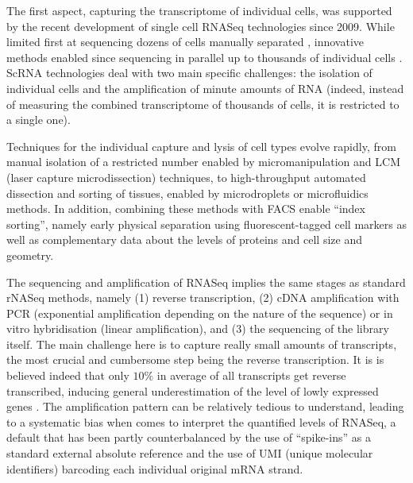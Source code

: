 The first aspect, capturing the transcriptome of individual cells, was supported by the recent development of single cell RNASeq technologies since 2009. While limited first at sequencing dozens of cells manually separated \autocite{tang_etal09}, innovative methods enabled since sequencing in parallel up to thousands of individual cells \autocite{fan_etal15}. ScRNA technologies deal with two main specific challenges: the isolation of individual cells and the amplification of minute amounts of RNA (indeed, instead of measuring the combined transcriptome of thousands of cells, it is restricted to a single one). 

Techniques for the individual capture and lysis of cell types evolve rapidly, from manual isolation of a restricted number enabled by micromanipulation and LCM (laser capture microdissection) techniques, to high-throughput automated dissection and sorting of tissues, enabled by microdroplets or microfluidics methods. In addition, combining these methods with FACS enable \enquote{index sorting}, namely early physical separation using fluorescent-tagged cell markers as well as complementary data about the levels of proteins and cell size and geometry.

The sequencing and amplification of RNASeq implies the same stages as standard rNASeq methods, namely (1) reverse transcription, (2) cDNA amplification with PCR (exponential amplification depending on the nature of the sequence) or in vitro hybridisation (linear amplification), and (3) the sequencing of the library itself. The main challenge here is to capture really small amounts of transcripts, the most crucial and cumbersome step being the reverse transcription. It is is believed indeed that only $10\%$ in average of all transcripts get reverse transcribed, inducing general underestimation of the level of lowly expressed genes . The amplification pattern can be relatively tedious to understand, leading to a systematic bias when comes to interpret the quantified levels of RNASeq, a default that has been partly counterbalanced by the use of \enquote{spike-ins} as a standard external absolute reference  and the use of UMI (unique molecular identifiers) barcoding each individual original mRNA strand. 

